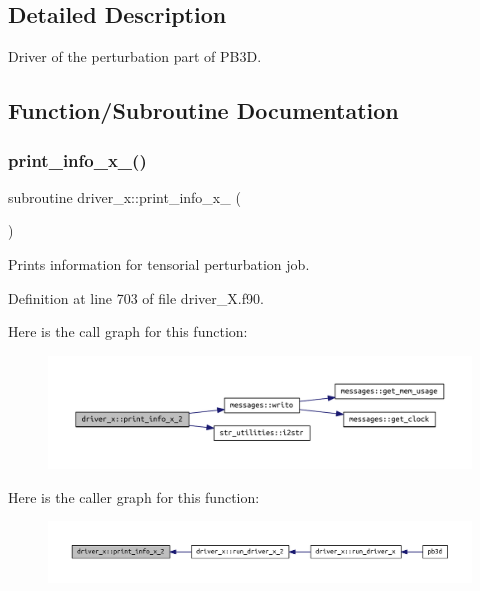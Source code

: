 \subsection{Detailed Description}
Driver of the perturbation part of P\+B3D. 

\subsection{Function/\+Subroutine Documentation}
\mbox{\label{namespacedriver__x_aca49d362e21df044e21d5ba4b2599cf4}} 
\subsubsection{\texorpdfstring{print\+\_\+info\+\_\+x\+\_()}{print\_info\_x\_2()}}
{\footnotesize\ttfamily subroutine driver\+\_\+x\+::print\+\_\+info\+\_\+x\+\_ (\begin{DoxyParamCaption}{ }\end{DoxyParamCaption})}



Prints information for tensorial perturbation job. 



Definition at line 703 of file driver\+\_\+\+X.\+f90.

Here is the call graph for this function\+:\nopagebreak
\begin{figure}[H]
\begin{center}
\leavevmode
\includegraphics[width=350pt]{namespacedriver__x_aca49d362e21df044e21d5ba4b2599cf4_cgraph}
\end{center}
\end{figure}
Here is the caller graph for this function\+:\nopagebreak
\begin{figure}[H]
\begin{center}
\leavevmode
\includegraphics[width=350pt]{namespacedriver__x_aca49d362e21df044e21d5ba4b2599cf4_icgraph}
\end{center}
\end{figure}
\mbox{\label{namespacedriver__x_ada3d72a0929daaa5e3da585246d62281}} 
